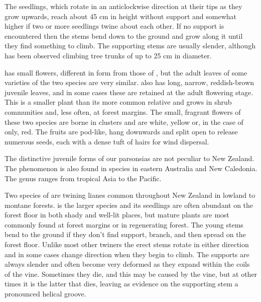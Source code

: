 The seedlings, which rotate in an anticlockwise direction at their tips as they grow upwards, reach about 45 cm in height without support and somewhat higher if two or more seedlings twine about each other.
If no support is encountered then the stems bend down to the ground and grow along it until they find something to climb.
The supporting stems are usually slender, although  has been observed climbing tree trunks of up to 25 cm in diameter.

 has small flowers, different in form from those of , but the adult leaves of some varieties of the two species are very similar.  also has long, narrow, reddish-brown juvenile leaves, and in some cases these are retained at the adult flowering stage.
This is a smaller plant than its more common relative and grows in shrub communities and, less often, at forest margins.
The small, fragrant flowers of these two species are borne in clusters and are white, yellow or, in the case of  only, red.
The fruits are pod-like, hang downwards and split open to release numerous seeds, each with a dense tuft of hairs for wind dispersal.

The distinctive juvenile forms of our parsonsias are not peculiar to New Zealand.
The phenomenon is also found in species in eastern Australia and New Caledonia.
The genus ranges from tropical Asia to the Pacific.

Two species of  are twining lianes common throughout New Zealand in lowland to montane forests.  is the larger species and its seedlings are often abundant on the forest floor in both shady and well-lit places, but mature plants are most commonly found at forest margins or in regenerating forest.
The young stems bend to the ground if they don't find support, branch, and then spread on the forest floor.
Unlike most other twiners the erect stems rotate in either direction and in some cases change direction when they begin to climb.
The supports are always slender and often become very deformed as they expand within the coils of the vine.
Sometimes they die, and this may be caused by the vine, but at other times it is the latter that dies, leaving as evidence on the supporting stem a pronounced helical groove.

